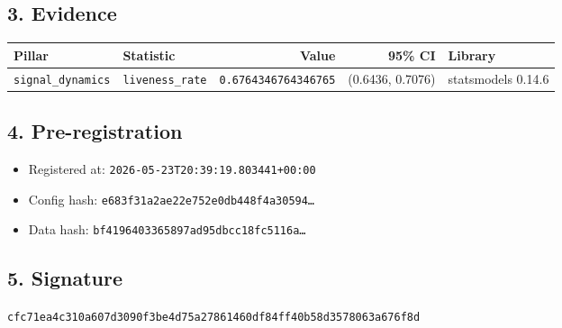 \documentclass{article}
\begin{document}
\subsection*{3. Evidence}
\begin{tabular}{llrrl}\toprule
\textbf{Pillar} & \textbf{Statistic} & \textbf{Value} & \textbf{95\% CI} & \textbf{Library} \\\midrule
\texttt{signal\_dynamics} & \texttt{liveness\_rate} & \texttt{0.6764346764346765} & (0.6436, 0.7076) & statsmodels 0.14.6 \\
\bottomrule\end{tabular}
\subsection*{4. Pre-registration}
\begin{itemize}
\item Registered at: \texttt{2026-05-23T20:39:19.803441+00:00}
\item Config hash: \texttt{e683f31a2ae22e752e0db448f4a30594\dots}
\item Data hash: \texttt{bf4196403365897ad95dbcc18fc5116a\dots}
\end{itemize}
\subsection*{5. Signature}
\texttt{cfc71ea4c310a607d3090f3be4d75a27861460df84ff40b58d3578063a676f8d}\\
\end{document}
